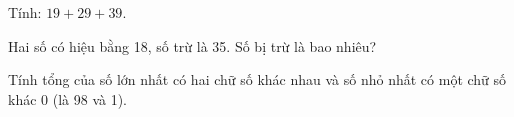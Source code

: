 \begin{ex}
Tính: $19 + 29 + 39$.
\end{ex}

\begin{ex}
Hai số có hiệu bằng 18, số trừ là 35. Số bị trừ là bao nhiêu?
\end{ex}

\begin{ex}
Tính tổng của số lớn nhất có hai chữ số khác nhau và số nhỏ nhất có một chữ số khác 0 (là 98 và 1).
\end{ex}
